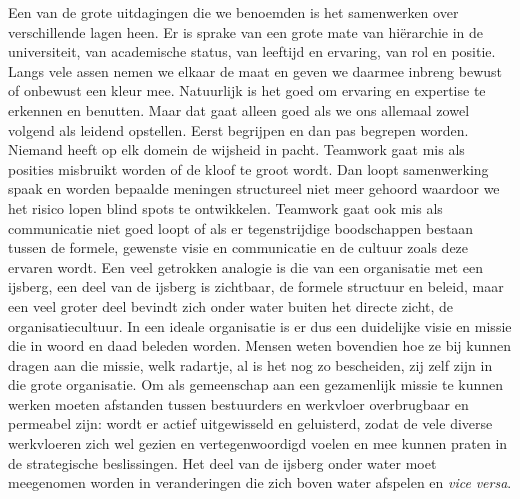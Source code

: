 \documentclass[smallauthor, chapterhaspagenum, nochapterinheader, pagenuminheader,  bigchapnum,medium2, tocpages,  garamond, titleinheader]{jote-book}
\begin{document}
	Een van de grote uitdagingen die we benoemden is het samenwerken over verschillende lagen heen. Er is sprake van een grote mate van hiërarchie in de universiteit, van academische status, van leeftijd en ervaring, van rol en positie. Langs vele assen nemen we elkaar de maat en geven we daarmee inbreng bewust of onbewust een kleur mee. Natuurlijk is het goed om ervaring en expertise te erkennen en benutten. Maar dat gaat alleen goed als we ons allemaal zowel volgend als leidend opstellen. Eerst begrijpen en dan pas begrepen worden. Niemand heeft op elk domein de wijsheid in pacht. Teamwork gaat mis als posities misbruikt worden of de kloof te groot wordt. Dan loopt samenwerking spaak en worden bepaalde meningen structureel niet meer gehoord waardoor we het risico lopen blind spots te ontwikkelen. Teamwork gaat ook mis als communicatie niet goed loopt of als er tegenstrijdige boodschappen bestaan tussen de formele, gewenste visie en communicatie en de cultuur zoals deze ervaren wordt. Een veel getrokken analogie is die van een organisatie met een ijsberg, een deel van de ijsberg is zichtbaar, de formele structuur en beleid, maar een veel groter deel bevindt zich onder water buiten het directe zicht, de organisatiecultuur. In een ideale organisatie is er dus een duidelijke visie en missie die in woord en daad beleden worden. Mensen weten bovendien hoe ze bij kunnen dragen aan die missie, welk radartje, al is het nog zo bescheiden, zij zelf zijn in die grote organisatie. Om als gemeenschap aan een gezamenlijk missie te kunnen werken moeten afstanden tussen bestuurders en werkvloer overbrugbaar en permeabel zijn: wordt er actief uitgewisseld en geluisterd, zodat de vele diverse werkvloeren zich wel gezien en vertegenwoordigd voelen en mee kunnen praten in de strategische beslissingen. Het deel van de ijsberg onder water moet meegenomen worden in veranderingen die zich boven water afspelen en \emph{vice}\emph{ versa}.
\end{document}
